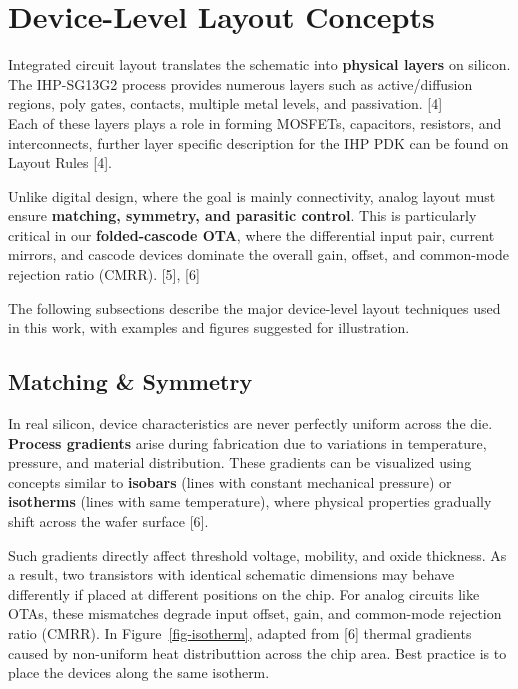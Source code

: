 \documentclass[
  11pt,
  a4paper,
  oneside]{scrbook}
\begin{document}
\chapter{Device-Level Layout
Concepts}\label{device-level-layout-concepts}

Integrated circuit layout translates the schematic into \textbf{physical
layers} on silicon.\\
The IHP-SG13G2 process provides numerous layers such as active/diffusion
regions, poly gates, contacts, multiple metal levels, and passivation.
{[}4{]}\\
Each of these layers plays a role in forming MOSFETs, capacitors,
resistors, and interconnects, further layer specific description for the
IHP PDK can be found on Layout Rules {[}4{]}.

Unlike digital design, where the goal is mainly connectivity, analog
layout must ensure \textbf{matching, symmetry, and parasitic control}.
This is particularly critical in our \textbf{folded-cascode OTA}, where
the differential input pair, current mirrors, and cascode devices
dominate the overall gain, offset, and common-mode rejection ratio
(CMRR). {[}5{]}, {[}6{]}

The following subsections describe the major device-level layout
techniques used in this work, with examples and figures suggested for
illustration.

\section{Matching \& Symmetry}\label{matching-symmetry}

In real silicon, device characteristics are never perfectly uniform
across the die.\\
\textbf{Process gradients} arise during fabrication due to variations in
temperature, pressure, and material distribution. These gradients can be
visualized using concepts similar to \textbf{isobars} (lines with
constant mechanical pressure) or \textbf{isotherms} (lines with same
temperature), where physical properties gradually shift across the wafer
surface {[}6{]}.

Such gradients directly affect threshold voltage, mobility, and oxide
thickness. As a result, two transistors with identical schematic
dimensions may behave differently if placed at different positions on
the chip. For analog circuits like OTAs, these mismatches degrade input
offset, gain, and common-mode rejection ratio (CMRR). In
Figure~\ref{fig-isotherm}, adapted from {[}6{]} thermal gradients caused
by non-uniform heat distributtion across the chip area. Best practice is
to place the devices along the same isotherm.
\end{document}

